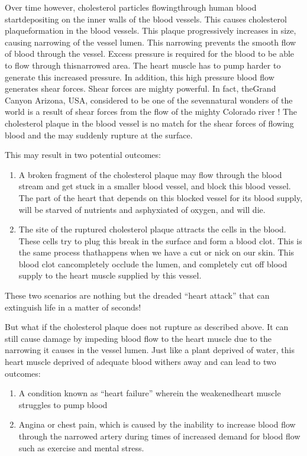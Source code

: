 Over time however, chole\-sterol particles flowing\break through human blood start\break depositing on the inner walls of the blood vessels. This cau\-ses choleste\-rol plaque\break formation in the blood vessels. This plaque progressively increases in size, causing narrowing of the vessel lumen. This narro\-wing prevents the smooth flow of blood through the vessel. Excess pressure is required for the blood to be able to flow through this\break narrowed area. The heart muscle has to pump harder to generate this increased pressure. In addition, this high pressure blood flow gene\-rates shear forces. Shear forces are mighty powerful. In fact, the\break Grand Canyon Arizona, USA, considered to be one of the seven\break natural wonders of the world is a result of shear forces from the flow of the mighty Colorado river ! The cholesterol plaque in the blood vessel is no match for the shear forces of flowing blood and the may suddenly rupture at the surface.

\noindent This may result in two potential outcomes:

\begin{enumerate}
\itemsep=0pt
\item A broken fragment of the choleste\-rol plaque may flow through the blood stream and get stuck in a smaller blood vessel, and block this blood vessel. The part of the heart that depends on this blocked vessel for its blood supply, will be starved of nutrients and asphyxiated of oxygen, and will die.
\item The site of the ruptured cholesterol plaque attracts the cells in the blood. These cells try to plug this break in the surface and form a blood clot. This is the same process that\break happens when we have a cut or nick on our skin. This blood clot can\break completely occlude the lumen, and completely cut off blood supply to the heart muscle supplied by this vessel.
\end{enumerate}

\clearpage
These two scenarios are nothing but the dreaded “heart attack” that can extinguish life in a matter of seconds!

But what if the cholesterol plaque does not rupture as described above. It can still cause damage by impeding blood flow to the heart muscle due to the narrowing it causes in the vessel lumen. Just like a plant deprived of water, this heart muscle deprived of adequate blood withers away and can lead to two outcomes:

\vspace{-\topsep}
\begin{enumerate}
\itemsep=0pt
\item A condition known as “heart failure” wherein the weakened\break heart muscle struggles to pump blood
\item Angina or chest pain, which is caused by the inability to increase blood flow through the narrowed artery during times of increa\-sed demand for blood flow such as exercise and mental stress.
\end{enumerate}
\vspace{-\topsep}

